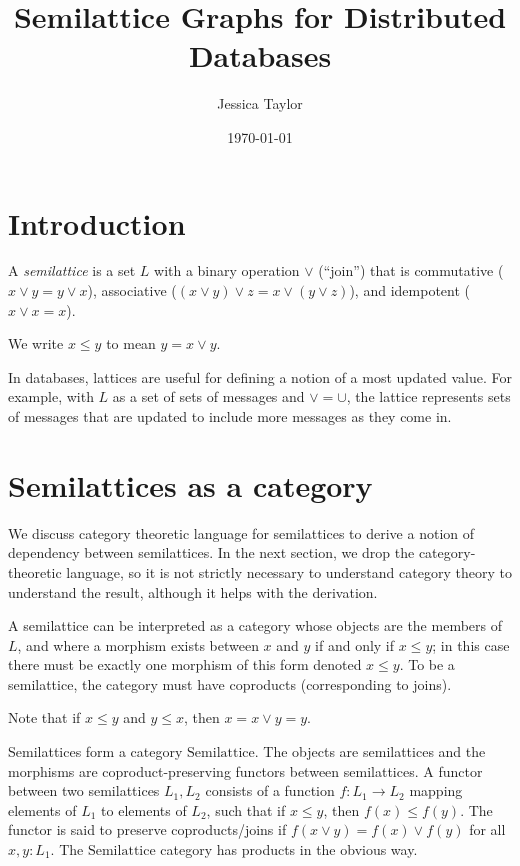 \documentclass{article}
\title{Semilattice Graphs for Distributed Databases}
\author{Jessica Taylor}
\date{\today}
\begin{document}
    \maketitle
    
    \section{Introduction}
        A \emph{semilattice} is a set $L$ with a binary operation $\vee$ (``join'') that is commutative ($x \vee y = y \vee x$), associative ($(x \vee y) \vee z = x \vee (y \vee z)$), and idempotent ($x \vee x = x$).

        We write $x \leq y$ to mean $y = x \vee y$.

        In databases, lattices are useful for defining a notion of a most updated value. For example, with $L$ as a set of sets of messages and $\vee = \cup$, the lattice represents sets of messages that are updated to include more messages as they come in.

    \section{Semilattices as a category}

      We discuss category theoretic language for semilattices to derive a notion of dependency between semilattices. In the next section, we drop the category-theoretic language, so it is not strictly necessary to understand category theory to understand the result, although it helps with the derivation.

      A semilattice can be interpreted as a category whose objects are the members of $L$, and where a morphism exists between $x$ and $y$ if and only if $x \leq y$; in this case there must be exactly one morphism of this form denoted $x \leq y$. To be a semilattice, the category must have coproducts (corresponding to joins).

      Note that if $x \leq y$ and $y \leq x$, then $x = x \vee y = y$.

      Semilattices form a category $\mathrm{Semilattice}$.  The objects are semilattices and the morphisms are coproduct-preserving functors between semilattices. A functor between two semilattices $L_1, L_2$ consists of a function $f: L_1 \rightarrow L_2$ mapping elements of $L_1$ to elements of $L_2$, such that if $x \leq y$, then $f(x) \leq f(y)$. The functor is said to preserve coproducts/joins if $f(x \vee y) = f(x) \vee f(y)$ for all $x, y : L_1$. The $\mathrm{Semilattice}$ category has products in the obvious way.
\end{document}
